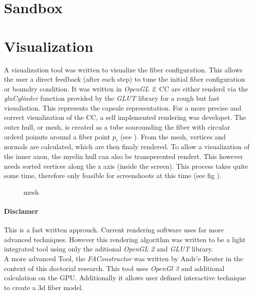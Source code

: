 \section{Sandbox}
% 
\section{Visualization}
% 
A visualization tool was written to visualize the fiber configuration. This allows the user a direct feedback (\eg after each step) to tune the initial fiber configuration or boundry condition. It was written in \textit{OpenGL 2}.
% 
\ac{CC} are either renderd via the \textit{gluCylinder} function provided by the \textit{GLUT} library for a rough but fast visualiation. This represents the capsule representation. For a more precise and correct visualization of the \ac{CC}, a self implemented rendering was developet. The outer hull, or mesh, is created as a tube sourounding the fiber with circular orderd poinuts around a fiber point $p_i$ (see \dummy).
% 
From the mesh, vertices and normals are calculated, which are then finaly rendered. To allow a visualization of the inner axon, the myelin hull can also be transperented rendert. This however needs sorted vertices along the z axis (inside the screen). This process takes quite some time, therefore only feasible for screenshoots at this time (see fig \dummy).
% 
\begin{figure}[!tb]
	\caption{mesh}
	\label{fig:vis_mesh}
\end{figure}
% 
\paragraph{Disclamer}
This is a fast written approuch. Current rendering software uses far more advanced techniques. However this rendering algorithm was written to be a light integrated tool using only the aditional \textit{OpenGL 2} and \textit{GLUT} library.\\
% 
A more advanced Tool, the \textit{FAConstructor} \cite{Reuter2019} was written by Andr'e Reuter in the context of this doctorial research. This tool uses \textit{OpenGl 3} and additional calculation on the GPU. Additionally it allows user defined interactive technique to create a 3d fiber model.
%  
% 
% 
% 
